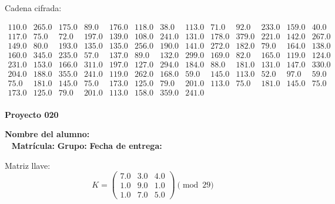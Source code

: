 \documentclass[12pt]{article}
\begin{document}
Cadena cifrada:
\begin{center}
$\begin{array}{lllllllllllll}
110.0 & 265.0 & 175.0 & 89.0 & 176.0 & 118.0 & 38.0 & 113.0 & 71.0 & 92.0 & 233.0 & 159.0 & 40.0\\
117.0 & 75.0 & 72.0 & 197.0 & 139.0 & 108.0 & 241.0 & 131.0 & 178.0 & 379.0 & 221.0 & 142.0 & 267.0\\
149.0 & 80.0 & 193.0 & 135.0 & 135.0 & 256.0 & 190.0 & 141.0 & 272.0 & 182.0 & 79.0 & 164.0 & 138.0\\
160.0 & 345.0 & 235.0 & 57.0 & 137.0 & 89.0 & 132.0 & 299.0 & 169.0 & 82.0 & 165.0 & 119.0 & 124.0\\
231.0 & 153.0 & 166.0 & 311.0 & 197.0 & 127.0 & 294.0 & 184.0 & 88.0 & 181.0 & 131.0 & 147.0 & 330.0\\
204.0 & 188.0 & 355.0 & 241.0 & 119.0 & 262.0 & 168.0 & 59.0 & 145.0 & 113.0 & 52.0 & 97.0 & 59.0\\
75.0 & 181.0 & 145.0 & 75.0 & 173.0 & 125.0 & 79.0 & 201.0 & 113.0 & 75.0 & 181.0 & 145.0 & 75.0\\
173.0 & 125.0 & 79.0 & 201.0 & 113.0 & 158.0 & 359.0 & 241.0\\
\end{array}$
\end{center}

\newpage


\textbf{Proyecto 020}

\textbf{Nombre del alumno:} \underline{\hspace{13cm}}\\\
\vspace{1cm}
\textbf{Matrícula:} \underline{\hspace{4cm}} \hspace{1cm}
\textbf{Grupo:} \underline{\hspace{2cm}}
\textbf{Fecha de entrega:} \underline{\hspace{2cm}}

\medskip

Matriz llave:
\[
K = \begin{pmatrix}
7.0 & 3.0 & 4.0\\
1.0 & 9.0 & 1.0\\
1.0 & 7.0 & 5.0
\end{pmatrix} \pmod{29}
\]
\end{document}
